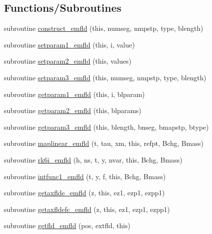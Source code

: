 \subsection*{Functions/\+Subroutines}
\begin{DoxyCompactItemize}
\item 
subroutine \mbox{\hyperlink{namespaceemfldclass_a2a7e6a32e149f3dc82fbbc59d5c6ec2d}{construct\+\_\+emfld}} (this, numseg, nmpstp, type, blength)
\item 
subroutine \mbox{\hyperlink{namespaceemfldclass_a89c21ffdad41e63e575b3bc21899f600}{setparam1\+\_\+emfld}} (this, i, value)
\item 
subroutine \mbox{\hyperlink{namespaceemfldclass_ad425987a9a6e1cb7b0b2b7b1724dc961}{setparam2\+\_\+emfld}} (this, values)
\item 
subroutine \mbox{\hyperlink{namespaceemfldclass_a3f40c1b18d4a7a28ceea11a3a6b350ad}{setparam3\+\_\+emfld}} (this, numseg, nmpstp, type, blength)
\item 
subroutine \mbox{\hyperlink{namespaceemfldclass_ae0e0b406ff0837e878753ad73fc1862d}{getparam1\+\_\+emfld}} (this, i, blparam)
\item 
subroutine \mbox{\hyperlink{namespaceemfldclass_af928aa17c18a7ebd339aece97387154b}{getparam2\+\_\+emfld}} (this, blparams)
\item 
subroutine \mbox{\hyperlink{namespaceemfldclass_a07a0d1aa7a4dc67bcec915f0d5d0945e}{getparam3\+\_\+emfld}} (this, blength, bnseg, bmapstp, btype)
\item 
subroutine \mbox{\hyperlink{namespaceemfldclass_ab283b339abd3df592d8200c244652131}{maplinear\+\_\+emfld}} (t, tau, xm, this, refpt, Bchg, Bmass)
\item 
subroutine \mbox{\hyperlink{namespaceemfldclass_ae4bfa1325df7cec4a3facbe8ebc66845}{rk6i\+\_\+emfld}} (h, ns, t, y, nvar, this, Bchg, Bmass)
\item 
subroutine \mbox{\hyperlink{namespaceemfldclass_af90bd5467acb5c62a2d93f6eb1738097}{intfunc1\+\_\+emfld}} (t, y, f, this, Bchg, Bmass)
\item 
subroutine \mbox{\hyperlink{namespaceemfldclass_a2b0b3e7b6537f3a6ea857f99288186ef}{getaxflde\+\_\+emfld}} (z, this, ez1, ezp1, ezpp1)
\item 
subroutine \mbox{\hyperlink{namespaceemfldclass_ae77f42a7f667c3dd902df1d26480e602}{getaxfldefc\+\_\+emfld}} (z, this, ez1, ezp1, ezpp1)
\item 
subroutine \mbox{\hyperlink{namespaceemfldclass_aa0023b4b2c7a17c75becc20eeb9be23c}{getfld\+\_\+emfld}} (pos, extfld, this)

\end{DoxyCompactItemize}
